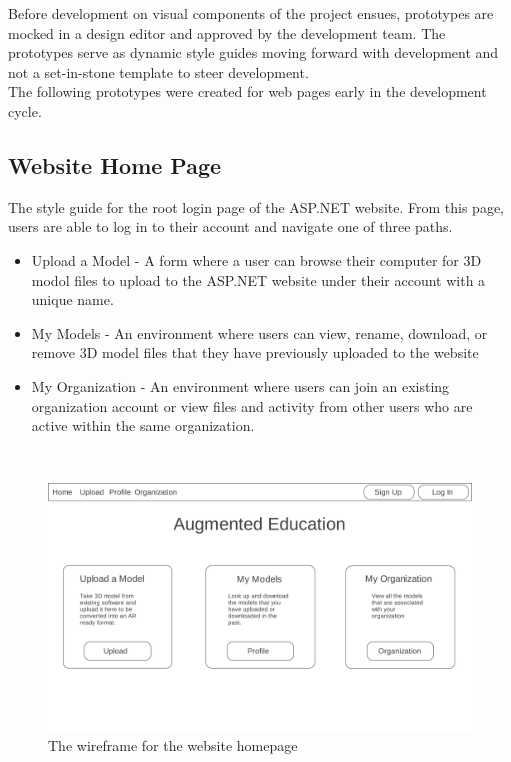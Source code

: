 \hspace{7mm}
Before development on visual components of the project ensues, prototypes are mocked in a
design editor and approved by the development team.  The prototypes serve
as dynamic style guides moving forward with development and not a set-in-stone template
to steer development.\\

The following prototypes were created for web pages early in the development cycle.

\subsection{Website Home Page}
    \hspace{7mm} The style guide for the root login page of the ASP.NET website.
    From this page, users are able to log in to their account and navigate 
    one of three paths.
        \begin{itemize} 
            \item Upload a Model -
                A form where a user can browse their computer for 3D modol files to
                upload to the ASP.NET website under their account with a unique name. 
            \item My Models - 
                An environment where users can view, rename, download, or remove
                3D model files that they have previously uploaded to the website
            \item My Organization -
                An environment where users can join an existing organization account
                or view files and activity from other users who are active within 
                the same organization.
        \end{itemize}
    \ \\
    \label{fig:proto_web_home}
    \begin{figure}[H]
        \centering \includegraphics[width=0.6\linewidth]{Home}
        \caption{The wireframe for the website homepage}
    \end{figure}

